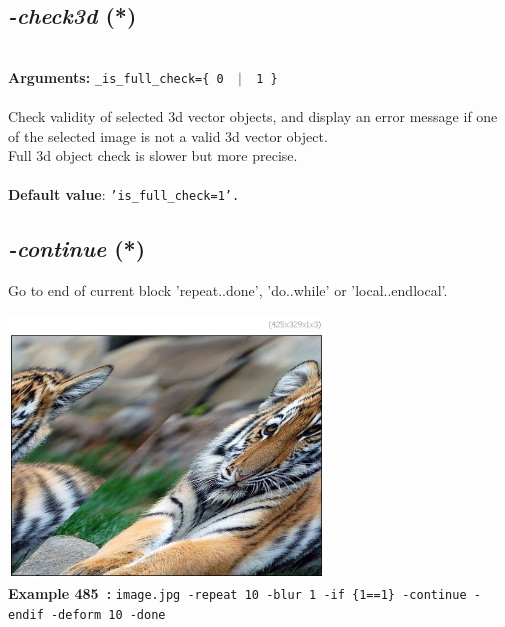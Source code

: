 \documentclass[a4paper,11pt,twoside]{book}
\begin{document}
\subsection{\emph{-check3d} (*)}\vspace*{-0.5em}
~\\\textbf{Arguments: } 
{\small \texttt{\_is\_full\_check=\{ 0 ~$|$~ 1 \}}}\\~\\
Check validity of selected 3d vector objects, and display an error message
if one of the selected image is not a valid 3d vector object.
~\\Full 3d object check is slower but more precise.
~\\~\\\textbf{Default value}: {\small \texttt{'is\_full\_check=1'.}}


\subsection{\emph{-continue} (*)}\vspace*{-0.5em}
Go to end of current block 'repeat..done', 'do..while' or 'local..endlocal'.
\begin{center}\includegraphics[keepaspectratio=true,height=7cm,width=\textwidth]{img/gmic_def485.jpg}\\
{\footnotesize \textbf{Example 485~:} \texttt{image.jpg -repeat 10 -blur 1 -if \{1==1\} -continue -endif -deform 10 -done}}
\end{center}
\end{document}
